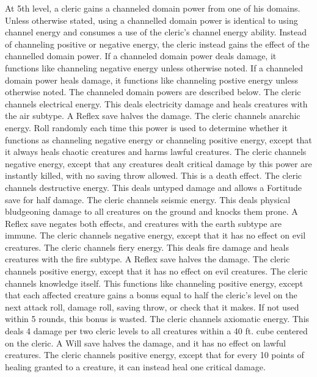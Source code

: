  At 5th level, a cleric gains a channeled domain power from one of his domains. Unless otherwise stated, using a channelled domain power is identical to using channel energy and consumes a use of the cleric's channel energy ability. Instead of channeling positive or negative energy, the cleric instead gains the effect of the channelled domain power. If a channeled domain power deals damage, it functions like channeling negative energy unless otherwise noted. If a channeled domain power heals damage, it functions like channeling postive energy unless otherwise noted. The channeled domain powers are described below.
 The cleric channels electrical energy. This deals electricity damage and heals creatures with the air subtype. A Reflex save halves the damage.
 The cleric channels anarchic energy. Roll randomly each time this power is used to determine whether it functions as channeling negative energy or channeling positive energy, except that it always heals chaotic creatures and harms lawful creatures.
 The cleric channels negative energy, except that any creatures dealt critical damage by this power are instantly killed, with no saving throw allowed. This is a death effect.
 The cleric channels destructive energy. This deals untyped damage and allows a Fortitude save for half damage.
 The cleric channels seismic energy. This deals physical bludgeoning damage to all creatures on the ground and knocks them prone. A Reflex save negates both effects, and creatures with the earth subtype are immune.
 The cleric channels negative energy, except that it has no effect on evil creatures.
 The cleric channels fiery energy. This deals fire damage and heals creatures with the fire subtype. A Reflex save halves the damage.
 The cleric channels positive energy, except that it has no effect on evil creatures.
 The cleric channels knowledge itself. This functions like channeling positive energy, except that each affected creature gains a bonus equal to half the cleric's level on the next attack roll, damage roll, saving throw, or check that it makes. If not used within 5 rounds, this bonus is wasted.
 The cleric channels axiomatic energy. This deals 4 damage per two cleric levels to all creatures within a 40 ft. cube centered on the cleric. A Will save halves the damage, and it has no effect on lawful creatures.
 The cleric channels positive energy, except that for every 10 points of healing granted to a creature, it can instead heal one critical damage.
